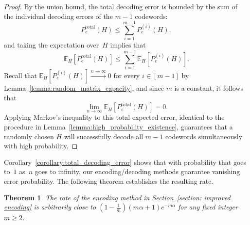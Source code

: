 \documentclass[journal,letterpaper,onecolumn,11pt]{IEEEtran}
\newtheorem{theorem}{Theorem}
\begin{document}
\begin{proof}
    By the union bound, the total decoding error is bounded by the sum of the individual decoding errors of the $m-1$ codewords:
    $$ P_e^{\text{total}}(H) \le \sum_{i=1}^{m-1} P_e^{(i)}(H),$$    
    and taking the expectation over~$H$ implies that %
    $$ \mathbb{E}_H\left[P_e^{\text{total}}(H)\right] \le \sum_{i=1}^{m-1} \mathbb{E}_H\left[P_e^{(i)}(H)\right].$$
    Recall that $\mathbb{E}_H[P_e^{(i)}(H)] \overset{n\to\infty}{\longrightarrow} 0$ for every $i \in [m-1]$ by Lemma~\ref{lemma:random_matrix_capacity}, and since $m$ is a constant, it follows that
    $$ \lim_{n \to \infty} \mathbb{E}_H\left[P_e^{\text{total}}(H)\right] = 0.$$
    Applying Markov's inequality to this total expected error, identical to the procedure in Lemma~\ref{lemma:high_probability_existence}, guarantees that a randomly chosen $H$ will successfully decode all $m-1$ codewords simultaneously with high probability.
\end{proof}
 Corollary~\ref{corollary:total_decoding_error} shows that with probability that goes to~$1$ as~$n$ goes to infinity, our encoding/decoding methods guarantee vanishing error probability.
 The following theorem establishes the resulting rate.
\begin{theorem}\label{Theorem: rate calculation for improved encoding}
    The rate of the encoding method in Section~\ref{section: improved encoding} is arbitrarily close to $(1-\frac{1}{m})(m\alpha+1)e^{-m\alpha}$ for any fixed integer $m\geq 2$.
\end{theorem}
\end{document}
